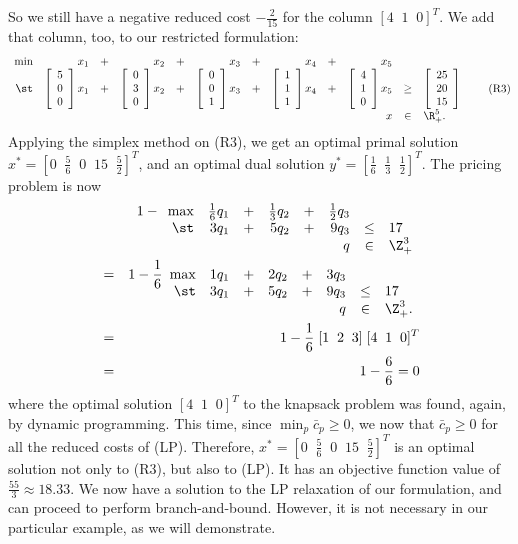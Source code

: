 So we still have a negative reduced cost $- \frac{2}{15}$ for the
column $[ 4 \;\; 1 \;\; 0 ]^T$. We add that column, too, to our restricted
formulation:
\[
\begin{array}{rrcrcrcrcrcl}
\min & x_1 & + & x_2 & + & x_3 & + & x_4 & + & x_5 & & \\
\st &
	\vvec{5 \\ 0 \\ 0} x_1 & + &
	\vvec{0 \\ 3 \\ 0} x_2 & + &
	\vvec{0 \\ 0 \\ 1} x_3 & + &
	\vvec{1 \\ 1 \\ 1} x_4 & + &
	\vvec{4 \\ 1 \\ 0} x_5 & \geq &
	\vvec{25 \\ 20 \\ 15} \\
 & & & & & & & & & x & \in & \R^5_+.
\end{array}
\tag{R3}
\]
Applying the simplex method on (R3), we get an optimal primal solution
$x^* = [ 0 \;\; \frac{5}{6} \;\; 0 \;\; 15 \;\; \frac{5}{2} ]^T$,
and an optimal dual
solution $y^* = [ \frac{1}{6} \;\; \frac{1}{3} \;\; \frac{1}{2} ]^T$.
The pricing problem is now
\begin{eqnarray*}
&   & 1 - \begin{array}[t]{rrcrcrcl}
	\max & \frac{1}{6} q_1 & + & \frac{1}{3} q_2 & + & \frac{1}{2} q_3 & & \\
	\st  &           3 q_1 & + &           5 q_2 & + &            9 q_3 & \leq & 17 \\
	     &                 &   &                 &   &              q   & \in  & \Z^3_+
	\end{array} \\
& = & 1 - \frac{1}{6} \begin{array}[t]{rrcrcrcl}
	\max &           1 q_1 & + &           2 q_2 & + &  3 q_3 & & \\
	\st  &           3 q_1 & + &           5 q_2 & + &  9 q_3 & \leq & 17 \\
	     &                 &   &                 &   &    q   & \in  & \Z^3_+.
	\end{array} \\
& = & 1 - \frac{1}{6} \; [ 1 \;\; 2 \;\; 3 ] \; [ 4 \;\; 1 \;\; 0 ]^T \\
& = & 1 - \frac{6}{6} = 0
\end{eqnarray*}
where the optimal solution $[ 4 \;\; 1 \;\; 0 ]^T$ to the knapsack problem
was found, again, by dynamic programming.
This time, since $\min_p \bar c_p \geq 0$, we now that $\bar c_p \geq 0$
for all the reduced costs of (LP).
Therefore, $x^* = [ 0 \;\; \frac{5}{6} \;\; 0 \;\; 15 \;\; \frac{5}{2} ]^T$
is an optimal solution not only to (R3), but also to (LP).
It has an objective function value of $\frac{55}{3} \approx 18.33$.
We now have a solution to the LP relaxation of our formulation, and
can proceed to perform branch-and-bound. However, it is not necessary
in our particular example, as we will demonstrate.

